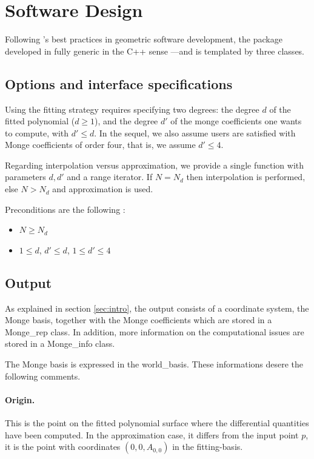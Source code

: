 \section{Software Design}

Following \cgal's best practices in geometric software development,
the package developed in fully generic in the C++ sense ---and is
templated by three classes.

\subsection{Options and interface specifications}

Using the fitting strategy requires specifying two degrees: the degree
$d$ of the fitted polynomial ($d \geq 1$), and the degree $d'$ of the
monge coefficients one wants to compute, with $d' \leq d $.  In the sequel,
we also assume users are satisfied with Monge coefficients of order
four, that is, we assume $d' \leq 4$.
\medskip

Regarding interpolation versus approximation, we provide a single
function  with parameters $d,d'$ and a
range iterator. If $N=N_d$ then interpolation is performed, else
$N > N_d$ and approximation is used. 

Preconditions are the following :

\begin{itemize}
\item
$N \geq N_d$
\item
$1 \leq d$, $d' \leq d$, $1 \leq d' \leq 4$ 
\end{itemize}	
 
\subsection{Output}

As explained in section \ref{sec:intro}, the output consists of a
coordinate system, the Monge basis, together with the Monge
coefficients which are stored in a Monge\_rep class. In addition, more
information on the computational issues are stored in a Monge\_info
class.

The Monge basis is expressed in the world\_basis. These informations
desere the following comments.

\paragraph{Origin.} This is the point on the fitted polynomial surface
where the differential quantities have been computed. In the
approximation case, it differs from the input point $p$, it is the
point with coordinates $(0,0,A_{0,0})$ in the fitting-basis.

